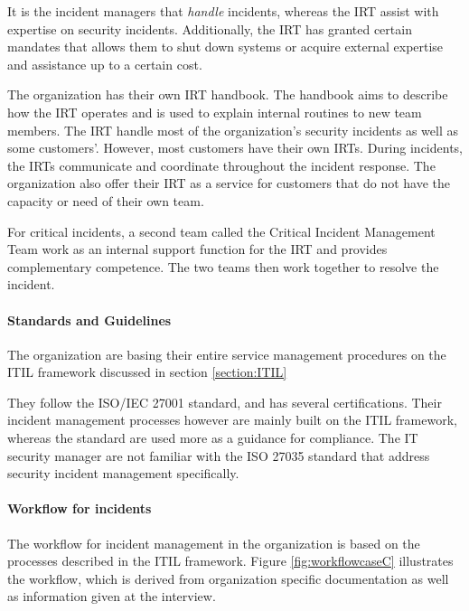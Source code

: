 It is the incident managers that \emph{handle} incidents, whereas the \ac{IRT} assist with expertise on security incidents. Additionally, the \ac{IRT} has granted certain mandates that allows them to shut down systems or acquire external expertise and assistance up to a certain cost.    

The organization has their own \ac{IRT} handbook. The handbook aims to describe how the \ac{IRT} operates and is used to explain internal routines to new team members. The \ac{IRT} handle most of the organization's security incidents as well as some customers'. However, most customers have their own \acp{IRT}. During incidents, the \acp{IRT} communicate and coordinate throughout the incident response. The organization also offer their \ac{IRT} as a service for customers that do not have the capacity or need of their own team.

For critical incidents, a second team called the Critical Incident Management Team work as an internal support function for the \ac{IRT} and provides complementary competence. The two teams then work together to resolve the incident. 

\paragraph{Standards and Guidelines}
The organization are basing their entire service management procedures on the ITIL framework discussed in section \ref{section:ITIL} 

They follow the ISO/IEC 27001 standard, and has several certifications. Their incident management processes however are mainly built on the ITIL framework, whereas the standard are used more as a guidance for compliance. The IT security manager are not familiar with the ISO 27035 standard that address security incident management specifically. 

\paragraph{Workflow for incidents}
The workflow for incident management in the organization is based on the processes described in the ITIL framework. Figure \ref{fig:workflowcaseC} illustrates the workflow, which is derived from organization specific documentation as well as information given at the interview. 

